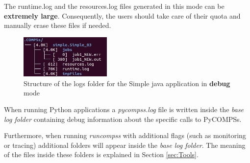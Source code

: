 The runtime.log and the resources.log files generated in this mode can be \textbf{extremely large}. Consequently, the users should
take care of their quota and manually erase these files if needed. \newline

\begin{figure}[h!]
  \centering
    \includegraphics[width=0.4\textwidth]{./Sections/3_Results_and_Logs/Figures/simple_log_debug.jpeg}
    \caption{Structure of the logs folder for the Simple java application in \textbf{debug} mode}
    \label{fig:simple_log_debug}
\end{figure}

When running Python applications a \textit{pycompss.log} file is written inside the \textit{base log folder} containing debug
information about the specific calls to PyCOMPSs. 

Furthermore, when running \textit{runcompss} with additional flags (such as monitoring or tracing) additional folders will appear inside the 
\textit{base log folder}. The meaning of the files inside these folders is explained in Section \ref{sec:Tools}. 
